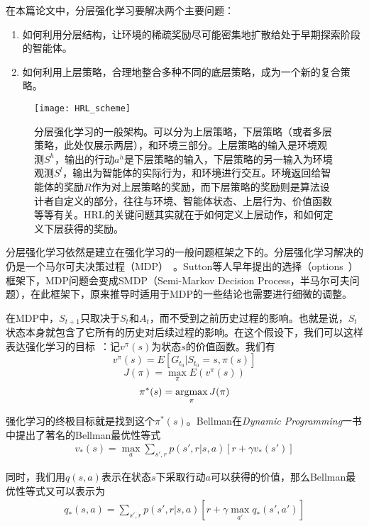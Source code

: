在本篇论文中，分层强化学习要解决两个主要问题：
\begin{enumerate}
  \item 如何利用分层结构，让环境的稀疏奖励尽可能密集地扩散给处于早期探索阶段的智能体。
  \item 如何利用上层策略，合理地整合多种不同的底层策略，成为一个新的复合策略。
\end{enumerate}

\begin{figure}[h] %
  \centering
  \texttt{[image: HRL\_scheme]}
  \caption{分层强化学习的一般架构。可以分为上层策略，下层策略（或者多层策略，此处仅展示两层），和环境三部分。上层策略的输入是环境观测$S^h$，输出的行动$a^h$是下层策略的输入，下层策略的另一输入为环境观测$S^l$，输出为智能体的实际行为，和环境进行交互。环境返回给智能体的奖励$R$作为对上层策略的奖励，而下层策略的奖励则是算法设计者自定义的部分，往往与环境、智能体状态、上层行为、价值函数等等有关。HRL的关键问题其实就在于如何定义上层动作，和如何定义下层获得的奖励。}
  \label{fig:HRL_scheme}
\end{figure}

分层强化学习依然是建立在强化学习的一般问题框架之下的。分层强化学习解决的仍是一个马尔可夫决策过程（MDP）~\cite{Bellman_MDP}。Sutton等人早年提出的选择（options~\cite{Sutton:1998_options}）框架下，MDP问题会变成SMDP（Semi-Markov Decision Process，半马尔可夫问题），在此框架下，原来推导时适用于MDP的一些结论也需要进行细微的调整。

在MDP中，$S_{t+1}$只取决于$S_t$和$A_t$，而不受到之前历史过程的影响。也就是说，$S_t$状态本身就包含了它所有的历史对后续过程的影响。在这个假设下，我们可以这样表达强化学习的目标~\cite{DRL_for_driving}：记$v^{\pi}(s)$为状态$s$的价值函数。我们有$$ v^{\pi}(s) = E[G_{t_0} | S_{t_0} = s, \pi(s) ] $$
      $$ J(\pi) = \max_{\pi} E(v^{\pi}(s)) $$
      $$ \pi^*(s) = \operatorname*{argmax}_{\pi} J(\pi) $$
    \par 强化学习的终极目标就是找到这个$\pi^*(s)$。Bellman在\textit{Dynamic Programming}一书中提出了著名的Bellman最优性等式~\cite{Bellman_DP}
    \begin{align}
       v_*(s) = \max_{a} \sum_{s', r}p(s', r | s, a)[r + \gamma v_*(s')]
    \end{align}
    \par 同时，我们用$q(s, a)$表示在状态$s$下采取行动$a$可以获得的价值，那么Bellman最优性等式又可以表示为
    \begin{align}
       q_*(s, a) = \sum_{s', r}p(s', r | s, a)[r + \gamma \max_{a'} q_*(s', a')]
    \end{align}


